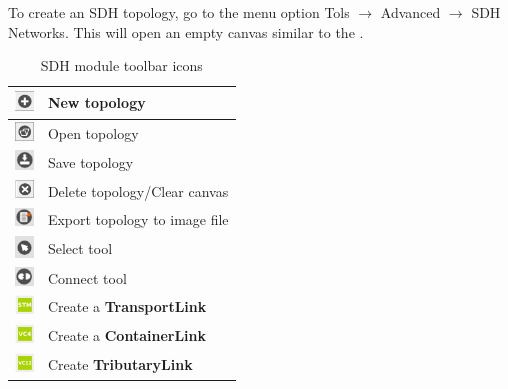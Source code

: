 \documentclass[a4paper]{article}
\begin{document}
		\newpage
		To create an SDH topology, go to the menu option Tols $\rightarrow$ Advanced $\rightarrow$ SDH Networks. This will open an empty canvas similar to the .
		\begin{table}[h!]
			\centering
			\begin{tabular}{lp{10cm}}
				\includegraphics[width=0.5cm]{img/icon_new_element.png} & New topology \\
				\midrule
				\includegraphics[width=0.5cm]{img/icon_open.png} & Open topology \\
				\midrule
				\includegraphics[width=0.5cm]{img/icon_save.png} & Save topology \\
				\midrule
				\includegraphics[width=0.5cm]{img/icon_delete.png} & Delete topology/Clear canvas \\
				\midrule
				\includegraphics[width=0.5cm]{img/icon_export.png} & Export topology to image file \\
				\midrule
				\includegraphics[width=0.5cm]{img/icon_select_tool.png} & Select tool \\
				\midrule
				\includegraphics[width=0.5cm]{img/icon_connect_tool.png} & Connect tool \\
				\midrule
				\includegraphics[width=0.5cm]{img/sdh_module_transport_link.png} & Create a \textbf{TransportLink} \\
				\midrule
				\includegraphics[width=0.5cm]{img/sdh_module_container_link.png} & Create a \textbf{ContainerLink} \\
				\midrule
				\includegraphics[width=0.5cm]{img/sdh_module_tributary_link.png} & Create \textbf{TributaryLink} \\
			\end{tabular}
			\caption{SDH module toolbar icons}
			\label{tab:sdh_module_icons}
		\end{table}
		
\end{document}

